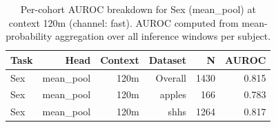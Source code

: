 \begin{table}[ht]
\centering
\caption{Per-cohort AUROC breakdown for Sex (mean_pool) at context 120m (channel: fast). AUROC computed from mean-probability aggregation over all inference windows per subject.}
\label{tab:cohort_sex_binary_mean_pool_fast}
\begin{tabular}{lrrrrr}
\toprule
Task & Head & Context & Dataset & N & AUROC \\
\midrule
Sex & mean_pool & 120m & Overall & 1430 & 0.815 \\
Sex & mean_pool & 120m & apples & 166 & 0.783 \\
Sex & mean_pool & 120m & shhs & 1264 & 0.817 \\
\bottomrule
\end{tabular}
\end{table}
